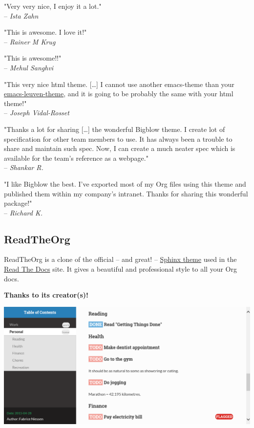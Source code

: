 \documentclass[11pt]{article}
\begin{document}
"Very very nice, I enjoy it a lot." \\[0pt]
-- \emph{Ista Zahn}

"This is awesome.  I love it!" \\[0pt]
-- \emph{Rainer M Krug}

"This is awesome!!" \\[0pt]
-- \emph{Mehul Sanghvi}

"This very nice html theme. [\ldots{}]  I cannot use another emacs-theme than your
\href{https://github.com/fniessen/emacs-leuven-theme}{emacs-leuven-theme}, and it is going to be probably the same with your html
theme!" \\[0pt]
-- \emph{Joseph Vidal-Rosset}

"Thanks a lot for sharing [\ldots{}] the wonderful Bigblow theme.  I create lot of
specification for other team members to use.  It has always been a trouble to
share and maintain such spec.  Now, I can create a much neater spec which is
available for the team's reference as a webpage." \\[0pt]
-- \emph{Shankar R.}

"I like Bigblow the best.  I've exported most of my Org files using this theme
and published them within my company's intranet.  Thanks for sharing this
wonderful package!" \\[0pt]
-- \emph{Richard K.}

\subsection{ReadTheOrg}
\label{sec:org8e6932a}

ReadTheOrg is a clone of the official -- and great! -- \href{https://github.com/snide/sphinx\_rtd\_theme}{Sphinx theme} used in the
\href{http://docs.readthedocs.org/en/latest/}{Read The Docs} site.  It gives a beautiful and professional style to all your Org
docs.

\textbf{Thanks to its creator(s)!}

\begin{center}
\includegraphics[width=.9\linewidth]{docs/readtheorg.png}
\end{center}
\end{document}
